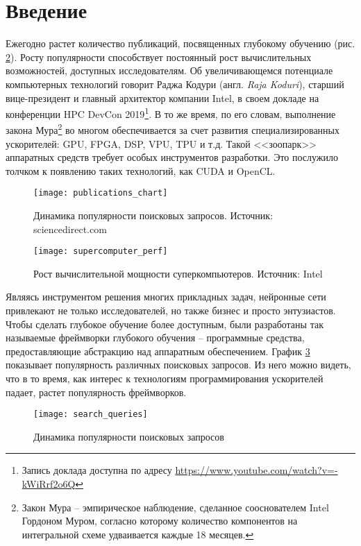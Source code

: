 \clearpage
\section{Введение}

Ежегодно растет количество публикаций, посвященных глубокому обучению (рис.
\ref{fig:publications}). Росту популярности способствует постоянный рост
вычислительных возможностей, доступных исследователям. Об увеличивающемся
потенциале компьютерных технологий говорит Раджа Кодури (англ. 
\textit{Raja Koduri}), старший вице-президент и главный архитектор компании
Intel, в своем докладе на конференции HPC DevCon 2019\footnote{Запись доклада
доступна по адресу \url{https://www.youtube.com/watch?v=-kWiRrf2o6Q}}.
В то же время, по его словам, выполнение закона Мура\footnote{Закон Мура -- 
эмпирическое наблюдение, сделанное сооснователем Intel Гордоном Муром, согласно
которому количество компонентов на интегральной схеме удваивается каждые 18
месяцев.} во многом обеспечивается за счет развития специализированных
ускорителей: GPU, FPGA, DSP, VPU, TPU и т.д. Такой <<зоопарк>> аппаратных
средств требует особых инструментов разработки. Это послужило толчком к появлению
таких технологий, как CUDA и OpenCL.
\begin{figure}[h]
\centering
\texttt{[image: publications\_chart]}
\caption{Динамика популярности поисковых запросов. Источник: sciencedirect.com}
\label{fig:publications}
\end{figure}
\begin{figure}[h]
\centering
\texttt{[image: supercomputer\_perf]}
\caption{Рост вычислительной мощности суперкомпьютеров. Источник: Intel}
\label{fig:publications}
\end{figure}

Являясь инструментом решения многих прикладных задач, нейронные сети привлекают
не только исследователей, но также бизнес и просто энтузиастов. Чтобы сделать
глубокое обучение более доступным, были разработаны так называемые фреймворки
глубокого обучения -- программные средства, предоставляющие абстракцию над
аппаратным обеспечением. График \ref{fig:search_queries} показывает популярность
различных поисковых запросов. Из него можно видеть, что в то время, как интерес
к технологиям программирования ускорителей падает, растет популярность
фреймворков.
\begin{figure}[h]
\centering
\texttt{[image: search\_queries]}
\caption{Динамика популярности поисковых запросов}
\label{fig:search_queries}
\end{figure}

